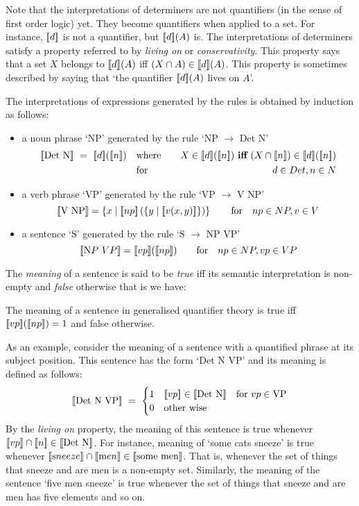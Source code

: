Note that the interpretations of determiners are not quantifiers (in the sense of first order logic) yet. They become quantifiers when applied to a set. For instance, $[\![ d ]\!]$ is not a quantifier, but $[\![ d ]\!](A)$ is. The interpretations of determiners satisfy a property referred to by \emph{living on} or \emph{conservativity}. This property says that a set $X$ belongs to  $[\![ d ]\!](A)$ iff  $(X \cap A) \in [\![ d ]\!](A)$. This property is sometimes described by saying that `the quantifier $[\![ d ]\!](A)$ lives on $A$'. 

\noindent
The interpretations of  expressions generated by the rules is obtained  by induction as follows:

\begin{itemize}
\item a noun phrase `NP' generated by the rule  `NP $\to$ Det N'  
\begin{eqnarray*}
\semantics{\mbox{Det N}} \ = \  \semantics{d}(\semantics{n})  
&\quad\text{where} \quad&  X \in \semantics{d}(\semantics{n}) \ \text{\bf iff} \ (X \cap \semantics{n}) \in \semantics{d}(\semantics{n})\\
&\quad \text{for} \quad&  d \in Det,  n \in N 
\end{eqnarray*}
\item a verb phrase `VP' generated by the rule `VP $\to$ V NP' 
\[
[\![ \mbox{V NP} ]\!] = \left\{x \mid [\![ np ]\!]\left(\{y \mid [\![ v( x, y) ]\!]\}\right)\right\} \qquad
 \text{for} \quad  np \in NP,  v \in V  
\]
\item a sentence `S' generated by the rule `S $\to$ NP VP'
\[
[\![ \text NP \ VP ]\!] = [\![ vp ]\!]([\![ np ]\!]) \qquad
 \text{for} \quad  np \in NP,  vp \in VP
\]
\end{itemize}

The \emph{meaning} of a sentence   is  said to be  \emph{true} iff its semantic interpretation is non-empty and \emph{false} otherwise that is we have:
\begin{definition}
The meaning of a sentence in generalised quantifier theory is true  iff $[\![ vp ]\!]([\![ np ]\!]) = 1$ and false otherwise. 
\end{definition}

As an example, consider the  meaning of a sentence with a quantified phrase at its subject position. This sentence has the form  `Det N VP'  and its meaning is defined as follows:
\[
[\![ \mbox{Det N VP} ]\!] \ = \ \begin{cases} 1 & [\![ vp ]\!] \in [\![ \mbox{Det N} ]\!]  \quad \text{for} \ vp \in \text{VP}\\
0 & \mbox{other wise}
\end{cases}
\]
By the \emph{living on} property, the meaning of this sentence is true whenever  $[\![ vp ]\!] \cap [\![ n ]\!] \in [\![ \mbox{Det N} ]\!]$. For instance, meaning of `some cats sneeze' is true whenever $[\![ \text sneeze ]\!] \cap [\![ \text men ]\!] \in [\![ \mbox{some men} ]\!]$. That is, whenever the set of things that sneeze and are men is a non-empty set. Similarly, the meaning of the  sentence `five men sneeze' is true whenever the set of things that sneeze and are men has five elements and so on.  

